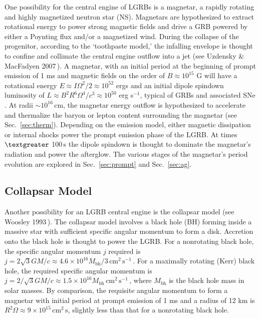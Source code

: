 \documentclass{article}
\begin{document}
One possibility for the central engine of LGRBs is a magnetar, a rapidly rotating and highly magnetized neutron star (NS). Magnetars are hypothesized to extract rotational energy to power strong magnetic fields and drive a GRB powered by either a Poynting flux and/or a magnetized wind. During the collapse of the progenitor, according to the `toothpaste model,'\cite{Uzdensky:2006wj} \cite{Bucciantini:2007hy} the infalling envelope is thought to confine and collimate the central engine outflow into a jet (see Uzdensky \& MacFadyen 2007\,\cite{Uzdensky:2006wj}). A magnetar, with an initial period at the beginning of prompt emission of 1 ms and magnetic fields on the order of $B \approx 10^{15}$ G will have a rotational energy $E \approx I \Omega^2/2 \approx 10^{52}$ ergs and an initial dipole spindown luminosity of $L \approx B^2 R^6\Omega^4/c^3 \approx 10^{50}$ erg s$^{-1}$, typical of GRBs and associated SNe \cite{Woosley:2006fn}. At radii $\sim 10^{16}$\,cm, the magnetar energy outflow is hypothesized to accelerate and thermalize the baryon or lepton content surrounding the magnetar (see Sec.~\ref{sec:therm}). Depending on the emission model, either magnetic dissipation or internal shocks power the prompt emission phase of the LGRB. At times $\textgreater$ 100\,s the dipole spindown is thought to dominate the magnetar's radiation and power the afterglow. The various stages of the magnetar's period evolution are explored in Sec.~\ref{sec:prompt} and Sec.~\ref{sec:ag}.

\subsection{Collapsar Model}

Another possibility for an LGRB central engine is the collapsar model (see Woosley 1993\,\cite{Woosley:1993ap}). The collapsar model involves a black hole (BH) forming inside a massive star with sufficient specific angular momentum to form a disk. Accretion onto the black hole is thought to power the LGRB. For a nonrotating black hole, the specific angular momentum $j$ required is $j=2 \sqrt{3} GM/c\approx 4.6 \times 10^{16} M_{\mathrm{bh}}/3\,\mathrm{cm}^2\,\mathrm{s}^{-1}$\,\cite{Woosley:2006fn}. For a maximally rotating (Kerr) black hole, the required specific angular momentum is $j=2/\sqrt{3} GM/c \approx 1.5 \times 10^{16} M_{\mathrm{bh}}\,\mathrm{cm}^2\,\mathrm{s}^{-1}$\,\cite{Woosley:2006fn}, where $M_{\mathrm{bh}}$ is the black hole mass in solar masses.  By comparison, the requisite angular momentum to form a magnetar with initial period at prompt emission of 1 ms and a radius of 12 km is $R^2 \Omega \approx 9 \times 10^{15}$\,$\mathrm{cm}^2\,\mathrm{s}$, slightly less than that for a nonrotating black hole.
\end{document}
